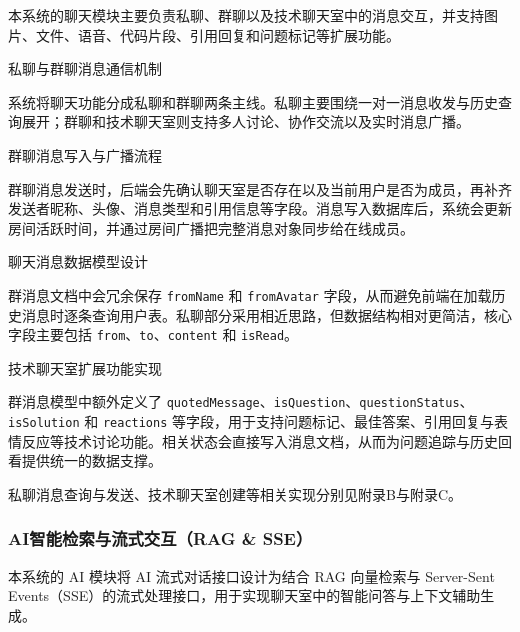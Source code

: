 本系统的聊天模块主要负责私聊、群聊以及技术聊天室中的消息交互，并支持图片、文件、语音、代码片段、引用回复和问题标记等扩展功能。

\begin{usecaselist}

\item 私聊与群聊消息通信机制

系统将聊天功能分成私聊和群聊两条主线。私聊主要围绕一对一消息收发与历史查询展开；群聊和技术聊天室则支持多人讨论、协作交流以及实时消息广播。

\item 群聊消息写入与广播流程

群聊消息发送时，后端会先确认聊天室是否存在以及当前用户是否为成员，再补齐发送者昵称、头像、消息类型和引用信息等字段。消息写入数据库后，系统会更新房间活跃时间，并通过房间广播把完整消息对象同步给在线成员。

\item 聊天消息数据模型设计

群消息文档中会冗余保存 \texttt{fromName} 和 \texttt{fromAvatar} 字段，从而避免前端在加载历史消息时逐条查询用户表。私聊部分采用相近思路，但数据结构相对更简洁，核心字段主要包括 \texttt{from}、\texttt{to}、\texttt{content} 和 \texttt{isRead}。

\item 技术聊天室扩展功能实现

群消息模型中额外定义了 \texttt{quotedMessage}、\texttt{isQuestion}、\texttt{questionStatus}、\texttt{isSolution} 和 \texttt{reactions} 等字段，用于支持问题标记、最佳答案、引用回复与表情反应等技术讨论功能。相关状态会直接写入消息文档，从而为问题追踪与历史回看提供统一的数据支撑。

\end{usecaselist}

私聊消息查询与发送、技术聊天室创建等相关实现分别见附录B与附录C。

\subsubsection{AI智能检索与流式交互（RAG \& SSE）}

本系统的 AI 模块将 AI 流式对话接口设计为结合 RAG 向量检索与 Server-Sent Events（SSE）的流式处理接口，用于实现聊天室中的智能问答与上下文辅助生成\cite{qaoverview2025,ragllmsurvey2024,ragsurveycn2025}。


